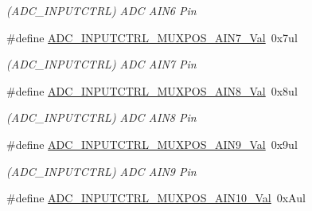 \begin{DoxyCompactItemize}
\begin{DoxyCompactList}\small\item\em (A\+D\+C\+\_\+\+I\+N\+P\+U\+T\+C\+T\+R\+L) A\+D\+C A\+I\+N6 Pin \end{DoxyCompactList}\item 
\hypertarget{group___s_a_m_l21___a_d_c_ga225a4cbb07c063427f5b635c1db6655a}{}\#define \hyperlink{group___s_a_m_l21___a_d_c_ga225a4cbb07c063427f5b635c1db6655a}{A\+D\+C\+\_\+\+I\+N\+P\+U\+T\+C\+T\+R\+L\+\_\+\+M\+U\+X\+P\+O\+S\+\_\+\+A\+I\+N7\+\_\+\+Val}~0x7ul\label{group___s_a_m_l21___a_d_c_ga225a4cbb07c063427f5b635c1db6655a}

\begin{DoxyCompactList}\small\item\em (A\+D\+C\+\_\+\+I\+N\+P\+U\+T\+C\+T\+R\+L) A\+D\+C A\+I\+N7 Pin \end{DoxyCompactList}\item 
\hypertarget{group___s_a_m_l21___a_d_c_ga2aee985fdfcb864f7d18c60c09c352e8}{}\#define \hyperlink{group___s_a_m_l21___a_d_c_ga2aee985fdfcb864f7d18c60c09c352e8}{A\+D\+C\+\_\+\+I\+N\+P\+U\+T\+C\+T\+R\+L\+\_\+\+M\+U\+X\+P\+O\+S\+\_\+\+A\+I\+N8\+\_\+\+Val}~0x8ul\label{group___s_a_m_l21___a_d_c_ga2aee985fdfcb864f7d18c60c09c352e8}

\begin{DoxyCompactList}\small\item\em (A\+D\+C\+\_\+\+I\+N\+P\+U\+T\+C\+T\+R\+L) A\+D\+C A\+I\+N8 Pin \end{DoxyCompactList}\item 
\hypertarget{group___s_a_m_l21___a_d_c_ga6ca797b644abff9b69cfa7b34f6129e6}{}\#define \hyperlink{group___s_a_m_l21___a_d_c_ga6ca797b644abff9b69cfa7b34f6129e6}{A\+D\+C\+\_\+\+I\+N\+P\+U\+T\+C\+T\+R\+L\+\_\+\+M\+U\+X\+P\+O\+S\+\_\+\+A\+I\+N9\+\_\+\+Val}~0x9ul\label{group___s_a_m_l21___a_d_c_ga6ca797b644abff9b69cfa7b34f6129e6}

\begin{DoxyCompactList}\small\item\em (A\+D\+C\+\_\+\+I\+N\+P\+U\+T\+C\+T\+R\+L) A\+D\+C A\+I\+N9 Pin \end{DoxyCompactList}\item 
\hypertarget{group___s_a_m_l21___a_d_c_gab884f040492006360c328164cfae72a3}{}\#define \hyperlink{group___s_a_m_l21___a_d_c_gab884f040492006360c328164cfae72a3}{A\+D\+C\+\_\+\+I\+N\+P\+U\+T\+C\+T\+R\+L\+\_\+\+M\+U\+X\+P\+O\+S\+\_\+\+A\+I\+N10\+\_\+\+Val}~0x\+Aul\label{group___s_a_m_l21___a_d_c_gab884f040492006360c328164cfae72a3}


\end{DoxyCompactItemize}
